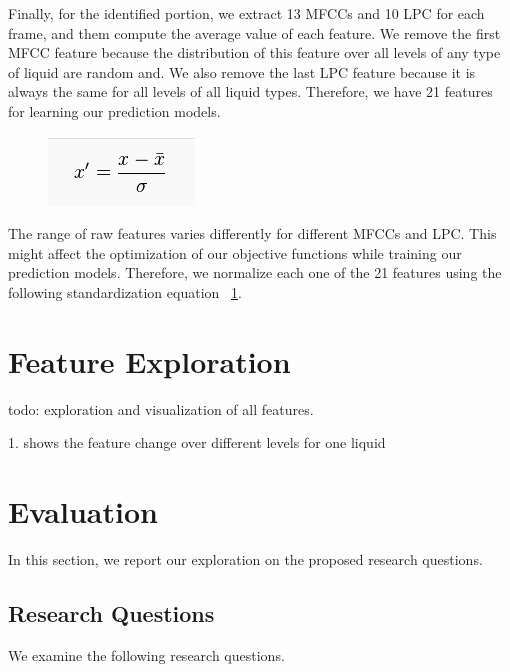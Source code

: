 \documentclass{article} %
\begin{document}
Finally, for the identified portion, we extract 13 MFCCs and 10 LPC for each frame, and them compute the average value of each feature. We remove the first MFCC feature because the distribution of this feature over all levels of any type of liquid are random and. We also remove the last LPC feature because it is always the same for all levels of all liquid types. Therefore, we have 21 features for learning our prediction models.

\begin{figure}
\centering
  \includegraphics[width=\linewidth]{standadization_equation.PNG}
  \label{fig:equation_std}
\end{figure}

The range of raw features varies differently for different MFCCs and LPC. This might affect the optimization of our objective functions while training our prediction models. Therefore, we normalize each one of the 21 features using the following standardization equation ~\ref{fig:equation_std}.


\section{Feature Exploration}
todo: exploration and visualization of all features.

1. shows the feature change over different levels for one liquid


\section{Evaluation}
In this section, we report our exploration on the proposed research questions.

\subsection{Research Questions}
We examine the following research questions.
\end{document}
